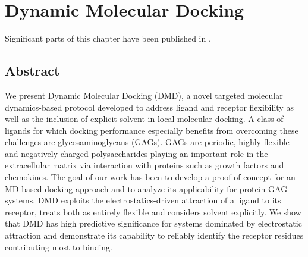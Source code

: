\chapter{Dynamic Molecular Docking}

Significant parts of this chapter have been published in \cite{
dmd_samsonov_gehrcke_2014}.

\section{Abstract}
We present Dynamic Molecular Docking (DMD), a novel
targeted molecular dy\-namics-based protocol developed to address ligand and
receptor flexibility as well as the inclusion of explicit solvent in local
molecular docking. A class of ligands for which docking performance especially
benefits from overcoming these challenges are glycosaminoglycans (GAGs). GAGs
are periodic, highly flexible and negatively charged polysaccharides playing an
important role in the extracellular matrix via interaction with proteins such as
growth factors and chemokines. The goal of our work has been to develop a proof
of concept for an MD-based docking approach and to analyze its applicability for
protein-GAG systems. DMD exploits the electrostatics-driven attraction of a
ligand to its receptor, treats both as entirely flexible and considers solvent
explicitly. We show that DMD has high predictive significance for systems
dominated by electrostatic attraction and demonstrate its capability to reliably
identify the receptor residues contributing most to binding.

